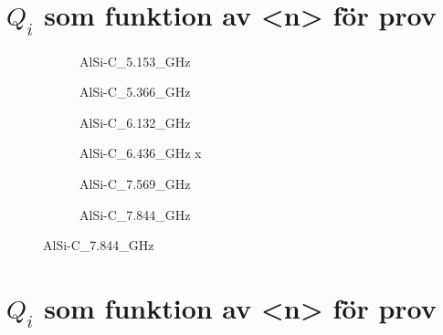 \documentclass[../../main.tex]{subfiles}
\begin{document}
\section{$Q_i$ som funktion av <n> för prov }
\begin{figure}[H]
    \begin{subfigure}{0.33\textwidth}
        \centering
        \setlength{}
        \setlength\figureheight{10em}
        
        \caption{AlSi-C\_5.153\_GHz}
    \end{subfigure}
    \begin{subfigure}{0.33\textwidth}
        \centering
        \setlength{}
        \setlength\figureheight{10em}
        
        \caption{AlSi-C\_5.366\_GHz}
    \end{subfigure}
    \begin{subfigure}{0.33\textwidth}
        \centering
        \setlength{}
        \setlength\figureheight{10em}
        
        \caption{AlSi-C\_6.132\_GHz}
    \end{subfigure}
    
    \begin{subfigure}{0.33\textwidth}
        \centering
        \setlength{}
        \setlength\figureheight{10em}
        
        \caption{AlSi-C\_6.436\_GHz x}
    \end{subfigure}
    \begin{subfigure}{0.33\textwidth}
        \centering
        \setlength{}
        \setlength\figureheight{10em}
        
        \caption{AlSi-C\_7.569\_GHz}
    \end{subfigure}
    \begin{subfigure}{0.33\textwidth}
        \centering
        \setlength{}
        \setlength\figureheight{10em}
        
        \caption{AlSi-C\_7.844\_GHz}
    \end{subfigure}
\end{figure}


\section{$Q_i$ som funktion av <n> för prov }
\end{document}

